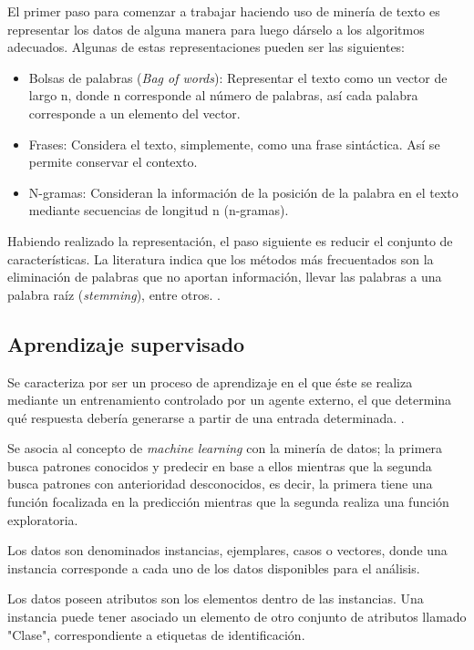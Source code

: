 	El primer paso para comenzar a trabajar haciendo uso de minería de texto es representar los datos de alguna manera para luego dárselo a los algoritmos adecuados. Algunas de estas representaciones pueden ser las siguientes:

	\begin{itemize}
	\item Bolsas de palabras (\textit{Bag of words}): Representar el texto como un vector de largo n, donde n corresponde al número de palabras, así cada palabra corresponde a un elemento del vector.
	\item Frases: Considera el texto, simplemente, como una frase sintáctica. Así se permite conservar el contexto.
	\item N-gramas: Consideran la información de la posición de la palabra en el texto mediante secuencias de longitud n (n-gramas). 
	\end{itemize}

	Habiendo realizado la representación, el paso siguiente es reducir el conjunto de características. La literatura indica que los métodos más frecuentados son la eliminación de palabras que no aportan información, llevar las palabras a una palabra raíz (\textit{stemming}), entre otros. \cite{DMPreprocessing}.

\subsection{Aprendizaje supervisado}
\label{subsec:aprendSuperv}

Se caracteriza por ser un proceso de aprendizaje en el que éste se realiza mediante un entrenamiento controlado por un agente externo, el que determina qué respuesta debería generarse a partir de una entrada determinada. \cite{AprendizajeSupervisado}.

Se asocia al concepto de \textit{machine learning} con la minería de datos; la primera busca patrones conocidos y predecir en base a ellos mientras que la segunda busca patrones con anterioridad desconocidos, es decir, la primera tiene una función focalizada en la predicción mientras que la segunda realiza una función exploratoria.

Los datos son denominados instancias, ejemplares, casos o vectores, donde una instancia corresponde a cada uno de los datos disponibles para el análisis.

Los datos poseen atributos son los elementos dentro de las instancias. Una instancia puede tener asociado un elemento de otro conjunto de atributos llamado "Clase", correspondiente a etiquetas de identificación.

